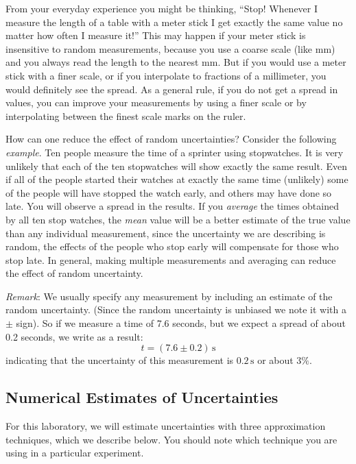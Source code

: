\documentclass{article}
\begin{document}
From your everyday experience you might be thinking, ``Stop! Whenever I measure the length of a table with a meter stick I get exactly the same value no matter how often I measure it!''   This may happen if your meter stick is insensitive to random measurements, because you use a coarse scale (like $\mathrm{mm}$) and you always read the length to the nearest $\mathrm{mm}$. But if you would use a meter stick with a finer scale, or if you interpolate to fractions of a millimeter, you would definitely see the spread. As a general rule, if you do not get a spread in values, you can improve your measurements by using a finer scale or by interpolating between the finest scale marks on the ruler. \myskip

How can one reduce the effect of random uncertainties?  Consider the following \emph{example}. Ten people measure the time of a sprinter using stopwatches. It is very unlikely that each of the ten stopwatches will show exactly the same result. Even if all of the people started their watches at exactly the same time (unlikely) some of the people will have stopped the watch early, and others may have done so late. You will observe a spread in the results. If you \emph{average} the times obtained by all ten stop watches, the \emph{mean} value will be a better estimate of the true value than any individual measurement, since the uncertainty we are describing is random, the effects of the people who stop early will compensate for those who stop late. In general, making multiple measurements and averaging can reduce the effect of random uncertainty. \myskip

\emph{Remark}: We usually specify any measurement by including an estimate of the random uncertainty. (Since the random uncertainty is unbiased we note it with a $\pm$ sign). So if we measure a time of 7.6 seconds, but we expect a spread of about 0.2 seconds, we write as a result:
\begin{equation}
    t = (7.6\pm 0.2)\,\mathrm{s}
\end{equation}
indicating that the uncertainty of this measurement is $0.2\,\mathrm{s}$ or about $3\%$. \myskip

\subsection{Numerical Estimates of Uncertainties}

For this laboratory, we will estimate uncertainties with three approximation techniques, which we describe below. You should note which technique you are using in a particular experiment.
\end{document}
